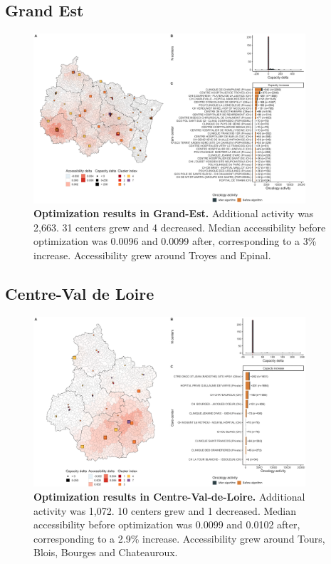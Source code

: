 \subsection*{Grand Est}

\begin{figure}[H]
    \includegraphics[width=0.9\textwidth]{images/camion/optim_region/optim_Grand-Est.png}
    \centering
    \caption{
        \textbf{Optimization results in Grand-Est.} Additional activity was 2,663. 31 centers grew and 4 decreased. Median accessibility before optimization was 0.0096 and 0.0099 after, corresponding to a 3\% increase. Accessibility grew around Troyes and Epinal.
    }
\end{figure}

\subsection*{Centre-Val de Loire}

\begin{figure}[H]
    \includegraphics[width=0.9\textwidth]{images/camion/optim_region/optim_Centre-Val-de-Loire.png}
    \centering
    \caption{
        \textbf{Optimization results in Centre-Val-de-Loire.} Additional activity was 1,072. 10 centers grew and 1 decreased. Median accessibility before optimization was 0.0099 and 0.0102 after, corresponding to a 2.9\% increase. Accessibility grew around Tours, Blois, Bourges and Chateauroux.
    }
\end{figure}


